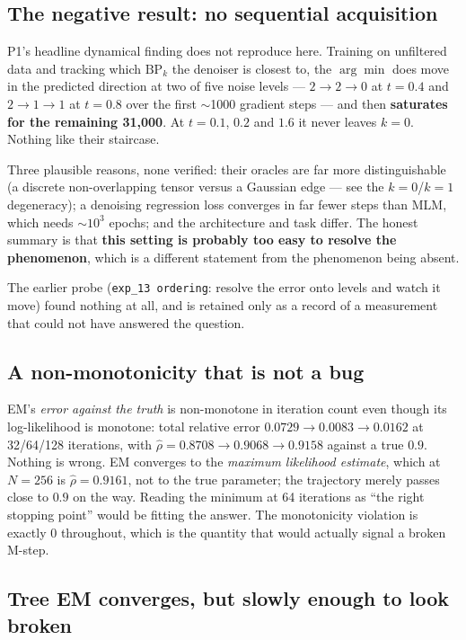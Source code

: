 \documentclass[11pt]{article}
\theoremstyle{remark}
\newcommand{\code}[1]{\texttt{\small #1}}
\begin{document}
\subsection{The negative result: no sequential acquisition}

P1's headline dynamical finding does not reproduce here. Training on unfiltered
data and tracking which $\mathrm{BP}_k$ the denoiser is closest to, the
$\arg\min$ does move in the predicted direction at two of five noise levels ---
$2\to2\to0$ at $t=0.4$ and $2\to1\to1$ at $t=0.8$ over the first $\sim$1000
gradient steps --- and then \textbf{saturates for the remaining 31{,}000}. At
$t=0.1$, $0.2$ and $1.6$ it never leaves $k=0$. Nothing like their staircase.

Three plausible reasons, none verified: their oracles are far more
distinguishable (a discrete non-overlapping tensor versus a Gaussian edge --- see
the $k{=}0$/$k{=}1$ degeneracy); a denoising regression loss converges in far
fewer steps than MLM, which needs $\sim10^3$ epochs; and the architecture and
task differ. The honest summary is that \textbf{this setting is probably too easy
to resolve the phenomenon}, which is a different statement from the phenomenon
being absent.

The earlier probe (\code{exp\_13 ordering}: resolve the error onto levels and
watch it move) found nothing at all, and is retained only as a record of a
measurement that could not have answered the question.

\subsection{A non-monotonicity that is not a bug}

EM's \emph{error against the truth} is non-monotone in iteration count even
though its log-likelihood is monotone: total relative error $0.0729 \to 0.0083
\to 0.0162$ at 32/64/128 iterations, with $\hat\rho = 0.8708 \to 0.9068 \to
0.9158$ against a true $0.9$. Nothing is wrong. EM converges to the
\emph{maximum likelihood estimate}, which at $N=256$ is $\hat\rho = 0.9161$, not
to the true parameter; the trajectory merely passes close to $0.9$ on the way.
Reading the minimum at 64 iterations as ``the right stopping point'' would be
fitting the answer. The monotonicity violation is exactly 0 throughout, which is
the quantity that would actually signal a broken M-step.

\subsection{Tree EM converges, but slowly enough to look broken}
\end{document}
